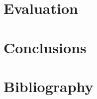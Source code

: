 \documentclass[12pt,a4paper]{report}
\begin{document}
\chapter{Evaluation}

\chapter{Conclusions}

\chapter*{Bibliography}  
% 
% 
\end{document}
